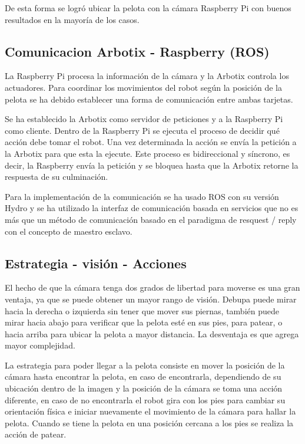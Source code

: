 De esta forma se logró ubicar la pelota con la cámara Raspberry Pi con buenos resultados en la mayoría de los casos. 
 
\subsection{Comunicacion Arbotix - Raspberry (ROS)}

La Raspberry Pi procesa la información de la cámara y la Arbotix controla los actuadores. Para coordinar los movimientos del robot según la posición de la pelota se ha debido establecer una forma de comunicación entre ambas tarjetas. 

Se ha establecido la Arbotix como servidor de peticiones y a la Raspberry Pi como cliente. Dentro de la Raspberry Pi se ejecuta el proceso de decidir qué acción debe tomar el robot. Una vez determinada la acción se envía la petición a la Arbotix para que esta la ejecute. Este proceso es bidireccional y síncrono, es decir, la Raspberry envía la petición y se bloquea hasta que la Arbotix retorne la respuesta de su culminación.  

Para la implementación de la comunicación se ha usado ROS con su versión Hydro y se ha utilizado la interfaz de comunicación basada en servicios que no es más que un método de comunicación basado en el paradigma de resquest / reply con el concepto de maestro esclavo.

\subsection{Estrategia - visión - Acciones}

El hecho de  que la cámara tenga dos grados de libertad para moverse es una gran ventaja, ya que se puede obtener un mayor rango de visión. Debupa puede mirar hacia la derecha o izquierda sin tener que mover sus piernas, también puede mirar hacia abajo para verificar que la pelota esté en sus pies, para patear, o hacia arriba para ubicar la pelota a mayor distancia. La desventaja es que agrega mayor complejidad.

La estrategia para poder llegar a la pelota consiste en mover la posición de la cámara hasta encontrar la pelota, en caso de encontrarla, dependiendo de su ubicación dentro de la imagen y la posición de la cámara se toma una acción diferente, en caso de no encontrarla el robot gira con los pies para cambiar su orientación física e iniciar nuevamente el movimiento de la cámara para hallar la pelota. Cuando se tiene la pelota en una posición cercana a los pies se realiza la acción de patear. 

